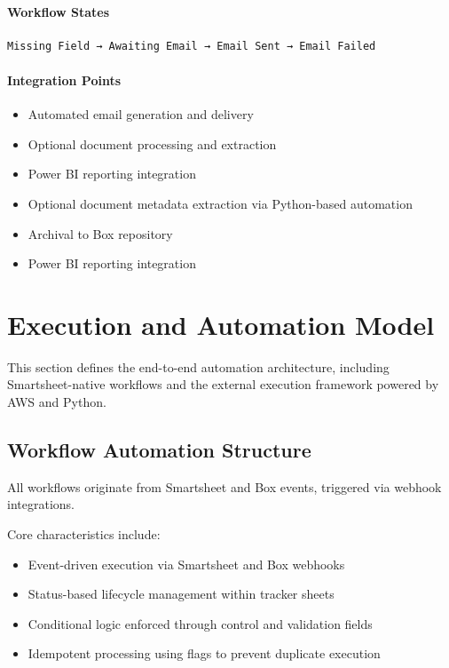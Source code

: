 \documentclass[12pt]{article}
\begin{document}
\paragraph{Workflow States}
\begin{verbatim}
Missing Field → Awaiting Email → Email Sent → Email Failed
\end{verbatim}

\paragraph{Integration Points}
\begin{itemize}[nosep]
    \item Automated email generation and delivery
    \item Optional document processing and extraction
    \item Power BI reporting integration
\end{itemize}
\begin{itemize}
    \item Optional document metadata extraction via Python-based automation
    \item Archival to Box repository
    \item Power BI reporting integration
\end{itemize}


\section{Execution and Automation Model}

This section defines the end-to-end automation architecture, including Smartsheet-native workflows and the external execution framework powered by AWS and Python.

\subsection{Workflow Automation Structure}

All workflows originate from Smartsheet and Box events, triggered via webhook integrations.

Core characteristics include:

\begin{itemize}
    \item Event-driven execution via Smartsheet and Box webhooks
    \item Status-based lifecycle management within tracker sheets
    \item Conditional logic enforced through control and validation fields
    \item Idempotent processing using flags to prevent duplicate execution
\end{itemize}
\end{document}
